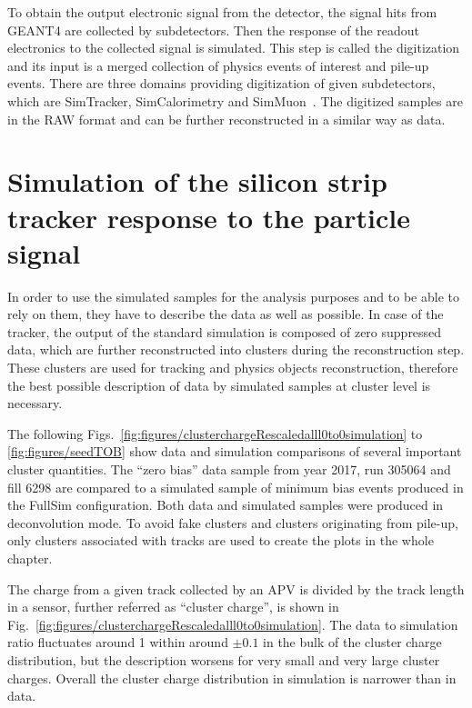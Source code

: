 To obtain the output electronic signal from the detector, the signal hits from GEANT4 are collected by subdetectors. Then the response of the readout electronics to the collected signal is simulated. This step is called the digitization and its input is a merged collection of physics events of interest and pile-up events. There are three domains providing digitization of given subdetectors, which are SimTracker, SimCalorimetry and SimMuon~\cite{website:simdigi}. The digitized samples are in the RAW format and can be further reconstructed in a similar way as data.

\newpage

\section{Simulation of the silicon strip tracker response to the particle signal~\label{sec:trackerSimu}}

In order to use the simulated samples for the analysis purposes and to be able to rely on them, they have to describe the data as well as possible. In case of the tracker, the output of the standard simulation is composed of zero suppressed data, which are further reconstructed into clusters during the reconstruction step. These clusters are used for tracking and physics objects reconstruction, therefore the best possible description of data by simulated samples at cluster level is necessary.

The following Figs.~\ref{fig:figures/clusterchargeRescaledalll0to0simulation} to \ref{fig:figures/seedTOB} show data and simulation comparisons of several important cluster quantities. The ``zero bias'' data sample from year 2017, run 305064 and fill 6298 are compared to a simulated sample of minimum bias events produced in the FullSim configuration. Both data and simulated samples were produced in deconvolution mode. To avoid fake clusters and clusters originating from pile-up, only clusters associated with tracks are used to create the plots in the whole chapter.
 
The charge from a given track collected by an APV is divided by the track length in a sensor, further referred as ``cluster charge'', is shown in Fig.~\ref{fig:figures/clusterchargeRescaledalll0to0simulation}. The data to simulation ratio fluctuates around 1 within around $\pm 0.1$ in the bulk of the cluster charge distribution, but the description worsens for very small and very large cluster charges. Overall the cluster charge distribution in simulation is narrower than in data. 

